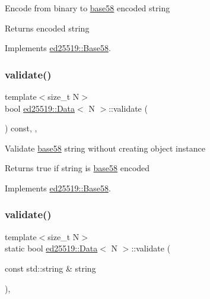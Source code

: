 Encode from binary to \mbox{\hyperlink{namespaceed25519_1_1base58}{base58}} encoded string \begin{DoxyReturn}{Returns}
encoded string 
\end{DoxyReturn}


Implements \mbox{\hyperlink{classed25519_1_1_base58_a1b52a018a5215e2dcf2aa388b0fe06bf}{ed25519\+::\+Base58}}.

\mbox{\label{classed25519_1_1_data_ac365c9862b45379c677449b622c74da5}} 
\subsubsection{\texorpdfstring{validate()}{validate()}\hspace{0.1cm}{\footnotesize\ttfamily [1/2]}}
{\footnotesize\ttfamily template$<$size\+\_\+t N$>$ \\
bool \mbox{\hyperlink{classed25519_1_1_data}{ed25519\+::\+Data}}$<$ N $>$\+::validate (\begin{DoxyParamCaption}{ }\end{DoxyParamCaption}) const\hspace{0.3cm}{\ttfamily [inline]}, {\ttfamily [override]}, {\ttfamily [virtual]}}

Validate \mbox{\hyperlink{namespaceed25519_1_1base58}{base58}} string without creating object instance \begin{DoxyReturn}{Returns}
true if string is \mbox{\hyperlink{namespaceed25519_1_1base58}{base58}} encoded 
\end{DoxyReturn}


Implements \mbox{\hyperlink{classed25519_1_1_base58_addfdb1d6d0f7e7f0cd0cf5dd2ee193bb}{ed25519\+::\+Base58}}.

\mbox{\label{classed25519_1_1_data_ade9c93cb08f9d60aa45e75821ed1bcbe}} 
\subsubsection{\texorpdfstring{validate()}{validate()}\hspace{0.1cm}{\footnotesize\ttfamily [2/2]}}
{\footnotesize\ttfamily template$<$size\+\_\+t N$>$ \\
static bool \mbox{\hyperlink{classed25519_1_1_data}{ed25519\+::\+Data}}$<$ N $>$\+::validate (\begin{DoxyParamCaption}\item[{const std\+::string \&}]{string }\end{DoxyParamCaption})\hspace{0.3cm}{\ttfamily [inline]}, {\ttfamily [static]}}

